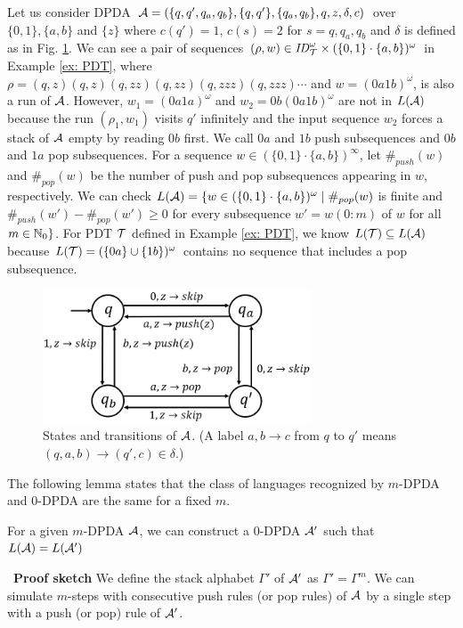 \begin{example}
\label{ex: PDA}
Let us consider DPDA
${\cal A} = (\{q,q',q_a,q_b\},\{q,q'\},\{q_a,q_b\},q,z,\delta,c)$
over $\{0,1\},\{a,b\}$ and $\{z\}$ where
$c(q')=1$, $c(s)=2$ for $s=q,q_a,q_b$ and
$\delta$ is defined as in Fig. \ref{fig: PDA}.
We can see
a pair of sequences $(\rho,w)\in \mathit{ID}_{\cal T}^\omega\times (\{0,1\}\cdot\{a,b\})^\omega$ in Example \ref{ex: PDT},
where $\rho=(q,z)(q,z)(q,zz)(q,zz)(q,zzz)(q,zzz)\cdots$
and $w=(0a1b)^\omega$,
is also a run of ${\cal A}$.
However, $w_1=(0a1a)^\omega$ and $w_2=0b(0a1b)^\omega$
are not in $L({\cal A})$ because
the run $(\rho_1,w_1)$ visits $q'$ infinitely and
the input sequence $w_2$ forces a stack of ${\cal A}$ empty
by reading $0b$ first.
We call $0a$ and $1b$ push subsequences and $0b$ and $1a$ pop subsequences.
For a sequence $w\in(\{0,1\}\cdot\{a,b\})^\infty$,
let $\#_{push}(w)$ and $\#_{pop}(w)$ be the number of
push and pop subsequences appearing in $w$, respectively.
We can check
$L({\cal A})=\{w\in(\{0,1\}\cdot\{a,b\})^\omega\mid
\#_{pop}(w)$ is finite and
$\#_{push}(w')-\#_{pop}(w')\geq 0$
for every subsequence $w'=w(0:m)$ of $w$ for all $m\in\mathbb{N}_0\}$.
For PDT ${\cal T}$ defined in Example \ref{ex: PDT},
we know $L({\cal T})\subseteq L({\cal A})$
because $L({\cal T})=(\{0a\}\cup\{1b\})^\omega$ contains no sequence that includes a pop subsequence.
\end{example}
\begin{figure}[t]
  \centering
  \includegraphics[width=8cm]{PDA.png}
  \caption{States and transitions of ${\cal A}$.
  (A label $a,b \to c$ from $q$ to $q'$ means
  $(q,a,b)\to(q',c)\in\delta$.)}
  \label{fig: PDA}
\end{figure}

The following lemma states that
the class of languages recognized by $m$-DPDA and $0$-DPDA are the same
for a fixed $m$.
\begin{lemma}
\label{lem: ef}
For a given $m$-DPDA ${\cal A}$,
we can construct a $0$-DPDA ${\cal A}'$ such that
$L({\cal A})=L({\cal A}')$
\end{lemma}\
{\bf Proof sketch}\quad
We define the stack alphabet $\Gamma'$ of ${\cal A}'$ as $\Gamma'=\Gamma^m$.
We can simulate $m$-steps with consecutive push rules (or pop rules) of ${\cal A}$
by a single step with a push (or pop) rule of ${\cal A}'$.

